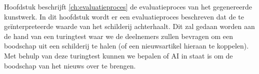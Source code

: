 Hoofdstuk beschrijft \ref{ch:evaluatieproces} de evaluatieproces van het gegenereerde kunstwerk. In dit hoofdstuk wordt er een evaluatieproces beschreven dat de te geïnterpreteerde waarde van het schilderij achterhaalt. Dit zal gedaan worden aan de hand van een turingtest waar we de deelnemers zullen bevragen om een boodschap uit een schilderij te halen (of een nieuwsartikel hieraan te koppelen). Met behulp van deze turingtest kunnen we bepalen of AI in staat is om de boodschap van het nieuws over te brengen.


